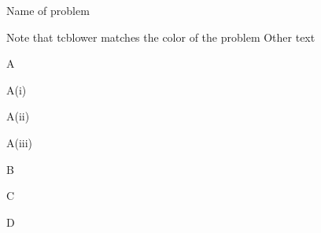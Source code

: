\begin{newProblem}{Name of problem}
    \begin{newInlineProblem}[NOTE]
    Note that tcblower matches the color of the problem
    \tcblower
    Other text
    \end{newInlineProblem}
\tcblower

\end{newProblem}
\begin{newProblem}[UNFINISHED]{}
    \begin{newInlineProblem}{A}
    \tcblower
        \begin{newInlineProblem}{A(i)}
        \tcblower
        \end{newInlineProblem}
        \begin{newInlineProblem}{A(ii)}
        \tcblower
        \end{newInlineProblem}
        \begin{newInlineProblem}[OPTIONAL]{A(iii)}
        \tcblower
        \end{newInlineProblem}
    \end{newInlineProblem}
    \begin{newInlineProblem}[UNFINISHED]{B}
    \tcblower
    \end{newInlineProblem}
    \begin{newInlineProblem}[UNFINISHED]{C}
    \tcblower
    \end{newInlineProblem}
    \begin{newInlineProblem}[OPTIONAL]{D}
    \tcblower 
    \end{newInlineProblem}
\end{newProblem}

\begin{newProblem}
\begin{newInlineProblem}[UNFINISHED]
\tcblower 
\end{newInlineProblem}
\tcblower
\begin{newInlineProblem}[NOTE]
\tcblower
\end{newInlineProblem}
\end{newProblem}

\tcblower

